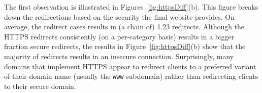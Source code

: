 \documentclass[letterpaper]{sig-alternate-10pt}
\begin{document}
The first observation is illustrated in Figures~\ref{fig:httpsDiff}(b).
This figure breaks down the redirections based on
the security the final website provides.
On average, the redirect cases results in (a chain of) 1.23 redirects.
Although the HTTPS redirects consistently (on a per-category basis)
results in a bigger fraction secure redirects, 
the results in Figure~\ref{fig:httpsDiff}(b) show that  
the majority of redirects results in an insecure connection.
Surprisingly, many domains that implement HTTPS appear to redirect clients 
to a preferred variant of their domain name (usually the \texttt{www} subdomain) 
rather than redirecting clients to their secure domain.
\end{document}
